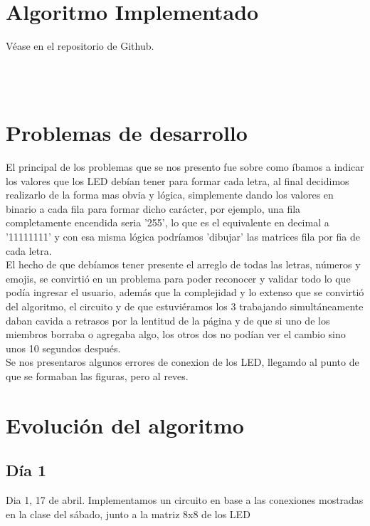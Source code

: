 \documentclass{article}
\begin{document}
\section{Algoritmo Implementado} \label{contenido}
Véase en el repositorio de Github.

\begin{lstlisting}



\end{lstlisting}
\section{Problemas de desarrollo} \label{conclulsion}
El principal de los problemas que se nos presento fue sobre como íbamos a indicar los valores que los LED debían tener para formar cada letra, al final decidimos realizarlo de la forma mas obvia y lógica, simplemente dando los valores en binario a cada fila para formar dicho carácter, por ejemplo, una fila completamente encendida seria '255', lo que es el equivalente en decimal a '11111111' y con esa misma lógica podríamos  'dibujar' las matrices fila por fia de cada letra. \\


El hecho de que debíamos tener presente el arreglo de todas las letras, números y emojis, se convirtió en un problema para poder reconocer y validar todo lo que podía ingresar el usuario, además que la complejidad y lo extenso que se convirtió del algoritmo, el circuito y de que estuviéramos los 3 trabajando simultáneamente daban cavida a retrasos por la lentitud de la página y de que si uno de los miembros borraba o agregaba algo, los otros dos no podían ver el cambio sino unos 10 segundos después.\\

Se nos presentaros algunos errores de conexion de los LED, llegamdo al punto de que se formaban las figuras, pero al reves.\\


\section{Evolución del algoritmo} \label{conclulsion}
\subsection{Día 1}
Dia 1, 17 de abril.
Implementamos un circuito en base a las conexiones mostradas en la clase del sábado, junto a la matriz 8x8 de los LED\\
\end{document}
